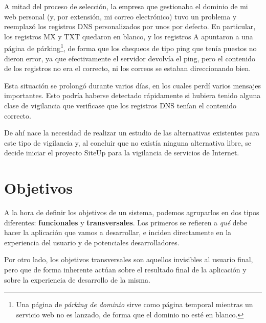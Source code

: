 A mitad del proceso de selección, la empresa que gestionaba el dominio de mi web
personal (y, por extensión, mi correo electrónico) tuvo un problema y reemplazó
los registros DNS personalizados por unos por defecto. En particular, los
registros MX y TXT quedaron en blanco, y los registros A apuntaron a una página
de párking\footnote{Una página de \textit{párking de dominio} sirve como página
  temporal mientras un servicio web no es lanzado, de forma que el dominio no
  esté en blanco.}, de forma que los chequeos de tipo ping que tenía puestos no
dieron error, ya que efectivamente el servidor devolvía el ping, pero el
contenido de los registros no era el correcto, ni los correos se estaban
direccionando bien.

Esta situación se prolongó durante varios días, en los cuales perdí varios
mensajes importantes. Esto podría haberse detectado rápidamente si hubiera tenido
alguna clase de vigilancia que verificase que los registros DNS tenían el
contenido correcto. 

De ahí nace la necesidad de realizar un estudio de las alternativas existentes
para este tipo de vigilancia y, al concluir que no existía ninguna alternativa
libre, se decide iniciar el proyecto SiteUp para la vigilancia de servicios de
Internet.


\section{Objetivos}
\label{sec:objetivos}

A la hora de definir los objetivos de un sistema, podemos agruparlos
en dos tipos diferentes: \textbf{funcionales} y
\textbf{transversales}. Los primeros se refieren a \textit{qué} debe
hacer la aplicación que vamos a desarrollar, e inciden
directamente en la experiencia del usuario y de potenciales
desarrolladores.

Por otro lado, los objetivos transversales son aquellos invisibles al
usuario final, pero que de forma inherente actúan sobre el resultado
final de la aplicación y sobre la experiencia de desarrollo de la misma.

